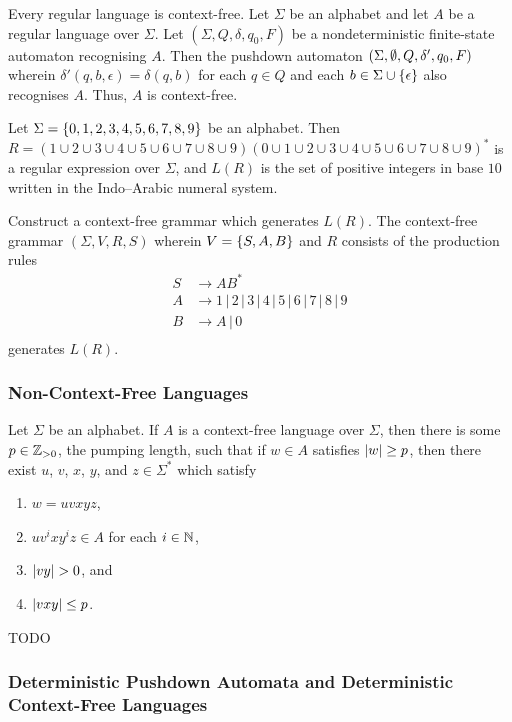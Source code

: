 \Bcr
    Every regular language is context-free.
\Ecr
\Bpr
    Let \(\Sigma\) be an alphabet and let \(A\) be a regular language over
    \(\Sigma\). Let \((\Sigma, Q, \delta, q_0, F)\) be a nondeterministic
    finite-state automaton recognising \(A\). Then the pushdown automaton
    \((\Sigma, \emptyset, Q, \delta', q_0, F)\) wherein \(\delta'(q, b, \epsilon) =
    \delta(q, b)\) for each \(q \in Q\) and each \(b \in \Sigma \cup
    \{\epsilon\}\) also recognises \(A\). Thus, \(A\) is context-free.
\Epr

\Bxr
    Let \(\Sigma = \{0, 1, 2, 3, 4, 5, 6, 7, 8, 9\}\) be an alphabet. Then \(R
    = (1 \cup 2 \cup 3 \cup 4 \cup 5 \cup 6 \cup 7 \cup 8 \cup 9) (0 \cup 1 \cup
    2 \cup 3 \cup 4 \cup 5 \cup 6 \cup 7 \cup 8 \cup 9)^*\) is a regular
    expression over \(\Sigma\), and \(L(R)\) is the set of positive integers in
    base \(10\) written in the Indo--Arabic numeral system.

    Construct a context-free grammar which generates \(L(R)\).
\Exr
\Bsl
    The context-free grammar \((\Sigma, V, R, S)\) wherein \(V = \{S, A, B\}\)
    and \(R\) consists of the production rules
    \begin{align*}
        S & \to A B^*\\
        A & \to 1 \, | \, 2 \, | \, 3 \, | \, 4 \, | \, 5 \, | \, 6 \, | \, 7 \,
        | \, 8 \, | \, 9\\
        B & \to A \, | \, 0\\
    \end{align*}
    generates \(L(R)\).
\Esl

\subsubsection{Non-Context-Free Languages}

    Let \(\Sigma\) be an alphabet. If \(A\) is a context-free language over
    \(\Sigma\), then there is some \(p \in \mathbb{Z}_{>0}\), the pumping length, such
    that if \(w \in A\) satisfies \(\lvert w\rvert \geq p\), then there exist \(u\),
    \(v\), \(x\), \(y\), and \(z \in \Sigma^*\) which satisfy
    \begin{enumerate}
        \item \(w = u v x y z\),
        \item \(u v^i x y^i z \in A\) for each \(i \in \mathbb{N}\),
        \item \(\lvert v y\rvert > 0\), and
        \item \(\lvert v x y\rvert \leq p\).
    \end{enumerate}
\Eth
\Bpr
    TODO
\Epr

\subsubsection{Deterministic Pushdown Automata and Deterministic Context-Free
Languages}

\Edc

